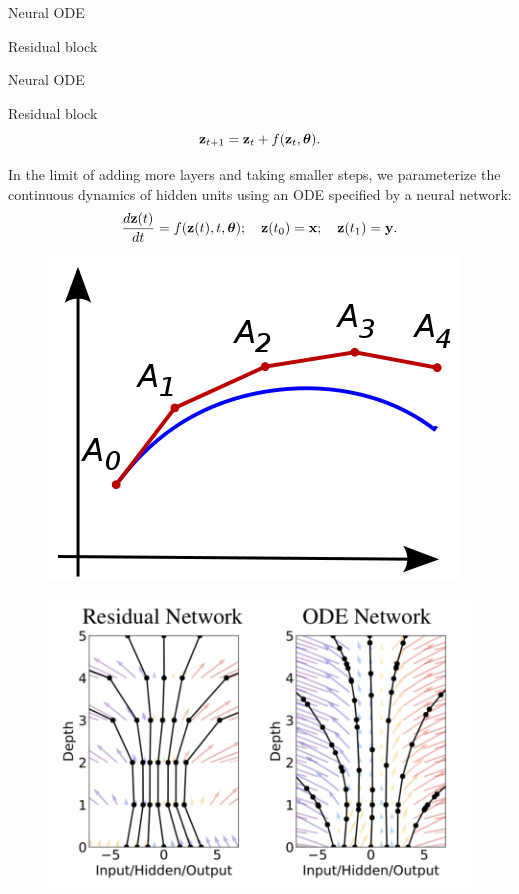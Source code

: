 \begin{frame}{Neural ODE}
\begin{block}{Residual block}
\begin{minipage}[t]{0.3\columnwidth}
\begin{figure}
			\end{figure}
		\end{minipage}
		\vspace{-0.4cm}
	\end{block}

\end{frame}
\begin{frame}{Neural ODE}
	\begin{block}{Residual block}
	\vspace{-0.4cm}
	\[
	    \mathbf{z}_{t+1} = \mathbf{z}_t + f(\mathbf{z}_t, \boldsymbol{\theta}).
	\]
	\vspace{-0.4cm}
	\end{block}
	In the limit of adding more layers and taking smaller steps, we parameterize the continuous dynamics of hidden units using an ODE specified by a neural network: 
	\[
	    \frac{d \mathbf{z}(t)}{dt} = f(\mathbf{z}(t), t, \boldsymbol{\theta}); \quad \mathbf{z}(t_0) = \mathbf{x}; \quad \mathbf{z}(t_1) = \mathbf{y}.
	\]
	\begin{minipage}[t]{0.4\columnwidth}
		\begin{figure}
			\centering
			\includegraphics[width=0.8\linewidth]{figs/euler}
		\end{figure}
	\end{minipage}%
	\begin{minipage}[t]{0.6\columnwidth}
		\vspace{-0.4cm}
		\begin{figure}
			\centering
			\includegraphics[width=0.9\linewidth]{figs/resnet_vs_neural_ode.png}

\end{figure}
\end{minipage}
\end{frame}
